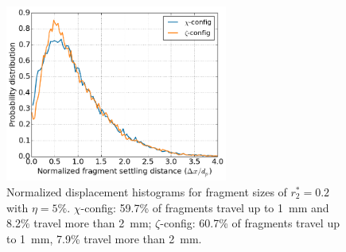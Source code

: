 \begin{figure}[!t]
    \centering
    \includegraphics[width = 0.65\textwidth]{figures/displacement_histograms.png}
    \caption{Normalized displacement histograms for fragment sizes of $r_2^* = 0.2$ with $\eta = 5\%$. $\chi$-config: 59.7\% of fragments travel up to \SI{1}{\milli\meter} and 8.2\% travel more than \SI{2}{\milli\meter}; $\zeta$-config: 60.7\% of fragments travel up to \SI{1}{\milli\meter}, 7.9\% travel more than \SI{2}{\milli\meter}.}\label{fig:displacement_hists}
\end{figure}

